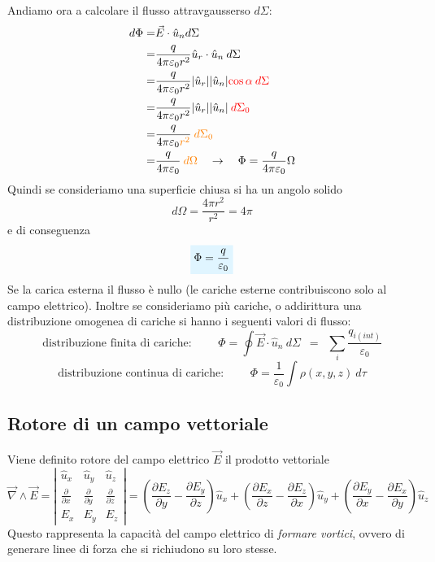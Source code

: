 \documentclass[x11names]{report}
\newcommand{\viola}[1]{%
	\colorbox{myblue}{$\displaystyle #1$}
}
\begin{document}
Andiamo ora a calcolare il flusso attravgausserso \(d\Sigma\):
\begin{align*}
	d\Phi =& \vec{E} \cdot \hat{u}_n d\Sigma \\ 
		  =& \frac{q}{4\pi\varepsilon_0 r^2} \hat{u}_r \cdot \hat{u}_n \: d\Sigma \\
		  =& \frac{q}{4\pi\varepsilon_0 r^2} |\hat{u}_r||\hat{u}_n|\textcolor{red}{\cos\alpha\: d\Sigma} \\ 
		  =& \frac{q}{4\pi\varepsilon_0 r^2} |\hat{u}_r||\hat{u}_n|\textcolor{red}{\: d\Sigma_0} \\
		  =& \frac{q}{4\pi\varepsilon_0  \textcolor{orange}{r^2}} \textcolor{orange}{\: d\Sigma_0} \\
		  =& \frac{q}{4\pi\varepsilon_0}\: \textcolor{orange}{d\Omega} \quad \to \quad \Phi = \frac{q}{4\pi\varepsilon_0}\Omega
\end{align*}
Quindi se consideriamo una superficie chiusa si ha un angolo solido 
\[
d\Omega = \frac{4\pi r^2}{r^2} = 4\pi
\]
e di conseguenza
\begin{equation}
	\viola{\Phi = \frac{q}{\varepsilon_0}}
\end{equation}
Se la carica esterna il flusso è nullo (le cariche esterne contribuiscono solo al campo elettrico). Inoltre se consideriamo più cariche, o addirittura una distribuzione omogenea di cariche si hanno i seguenti valori di flusso:
\[
\text{distribuzione finita di cariche: }\qquad \Phi = \oint \vec{E} \cdot \hat{u}_n \: d\Sigma \;\ = \;\ \sum_i \frac{q_{i(int)}}{\varepsilon_0}
\]
\[
\text{distribuzione continua di cariche: }\qquad \Phi = \frac{1}{\varepsilon_0}\int \rho(x,y,z) \:d\tau 
\]




\subsection{Rotore di un campo vettoriale}
Viene definito rotore del campo elettrico \(\vec{E}\) il prodotto vettoriale
\[
\vec{\nabla} \wedge \vec{E} = \left|\begin{array}{ccc}
	\hat{u}_x & \hat{u}_y & \hat{u}_z \\
	\frac{\partial}{\partial x} & \frac{\partial}{\partial y} & \frac{\partial}{\partial z} \\
	E_x & E_y & E_z 
\end{array}\right| = \left(\frac{\partial E_z}{\partial y}-\frac{\partial E_y}{\partial z}\right)\hat{u}_x + \left(\frac{\partial E_x}{\partial z}-\frac{\partial E_z}{\partial x}\right)\hat{u}_y + \left(\frac{\partial E_y}{\partial x}-\frac{\partial E_x}{\partial y}\right)\hat{u}_z
\]
Questo rappresenta la capacità del campo elettrico di \textit{formare vortici}, ovvero di generare linee di forza che si richiudono su loro stesse.
\end{document}
